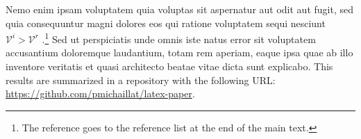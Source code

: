 \documentclass[letterpaper,12pt,leqno]{article}
\begin{document}
Nemo enim ipsam voluptatem quia voluptas sit aspernatur aut odit aut fugit, sed quia consequuntur magni dolores eos qui ratione voluptatem sequi nesciunt $\mathcal{V}^i > \mathcal{V}^r$ \citep{MS21b}.\footnote{The reference goes to the reference list at the end of the main text.} Sed ut perspiciatis unde omnis iste natus error sit voluptatem accusantium doloremque laudantium, totam rem aperiam, eaque ipsa quae ab illo inventore veritatis et quasi architecto beatae vitae dicta sunt explicabo. This results are summarized in a repository with the following URL: \url{https://github.com/pmichaillat/latex-paper}.
\end{document}
